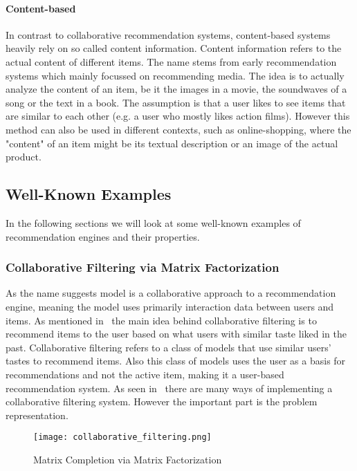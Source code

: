 \paragraph{Content-based}
In contrast to collaborative recommendation systems, content-based systems heavily rely on so called content information.
Content information refers to the actual content of different items.
The name stems from early recommendation systems which mainly focussed on recommending media.
The idea is to actually analyze the content of an item, be it the images in a movie, the soundwaves of a song or the text in a book.
The assumption is that a user likes to see items that are similar to each other (e.g. a user who mostly likes action films).
However this method can also be used in different contexts, such as online-shopping, where the "content" of an item might be its textual description or an image of the actual product.
\subsection{Well-Known Examples}
In the following sections we will look at some well-known examples of recommendation engines and their properties.
\subsubsection{Collaborative Filtering via Matrix Factorization}
As the name suggests model is a collaborative approach to a recommendation engine, meaning the model uses primarily interaction data between users and items.
As mentioned in~\cite{intro_recsys} the main idea behind collaborative filtering is to recommend items to the user based on what users with similar taste liked in the past.
Collaborative filtering refers to a class of models that use similar users' tastes to recommend items.
Also this class of models uses the user as a basis for recommendations and not the active item, making it a user-based recommendation system.
As seen in~\cite{collaborative_filtering} there are many ways of implementing a collaborative filtering system.
However the important part is the problem representation.

\begin{figure}[ht]
	\centering
	\captionsetup{width=0.8\textwidth}
    \texttt{[image: collaborative\_filtering.png]}
    \caption{Matrix Completion via Matrix Factorization}
    \label{fig:collaborative_filtering}
\end{figure}

